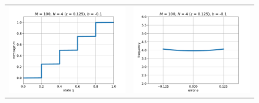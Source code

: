 \documentclass[12pt]{article}
\begin{document}
\begin{figure}[h]
\begin{center}
\begin{tabular}{cc}
			\includegraphics[scale=.5]{msg4} & \includegraphics[scale=.5]{err4} \\

\end{tabular}
\end{center}
\end{figure}
\end{document}
